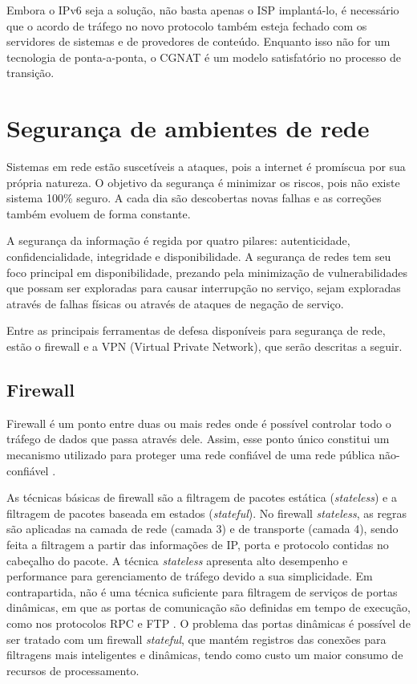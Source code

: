     Embora o IPv6 seja a solução, não basta apenas o ISP implantá-lo, é necessário que o acordo de tráfego no novo protocolo também esteja fechado com os servidores de sistemas e de provedores de conteúdo. Enquanto isso não for um tecnologia de ponta-a-ponta, o CGNAT é um modelo satisfatório no processo de transição.

\section{Segurança de ambientes de rede}

    Sistemas em rede estão suscetíveis a ataques, pois a internet é promíscua por sua própria natureza. O objetivo da segurança é minimizar os riscos, pois não existe sistema 100\% seguro. A cada dia são descobertas novas falhas e as correções também evoluem de forma constante.
    
    A segurança da informação é regida por quatro pilares: autenticidade, confidencialidade, integridade e disponibilidade. A segurança de redes tem seu foco principal em disponibilidade, prezando pela minimização de vulnerabilidades que possam ser exploradas para causar interrupção no serviço, sejam exploradas através de falhas físicas ou através de ataques de negação de serviço.
    
    Entre as principais ferramentas de defesa disponíveis para segurança de rede, estão o firewall e a VPN (Virtual Private Network), que serão descritas a seguir.

\subsection{Firewall}

    Firewall é um ponto entre duas ou mais redes onde é possível controlar todo o tráfego de dados que passa através dele. Assim, esse ponto único constitui um mecanismo utilizado para proteger uma rede confiável de uma rede pública não-confiável \cite{nakamura2007}.
    
    As técnicas básicas de firewall são a filtragem de pacotes estática (\textit{stateless}) e a filtragem de pacotes baseada em estados (\textit{stateful}). No firewall \textit{stateless}, as regras são aplicadas na camada de rede (camada 3) e de transporte (camada 4), sendo feita a filtragem a partir das informações de IP, porta e protocolo contidas no cabeçalho do pacote. A técnica \textit{stateless} apresenta alto desempenho e performance para gerenciamento de tráfego devido a sua simplicidade. Em contrapartida, não é uma técnica suficiente para filtragem de serviços de portas dinâmicas, em que as portas de comunicação são definidas em tempo de execução, como nos protocolos RPC e FTP \cite{nakamura2007}. O problema das portas dinâmicas é possível de ser tratado com um firewall \textit{stateful}, que mantém registros das conexões para filtragens mais inteligentes e dinâmicas, tendo como custo um maior consumo de recursos de processamento.
    
